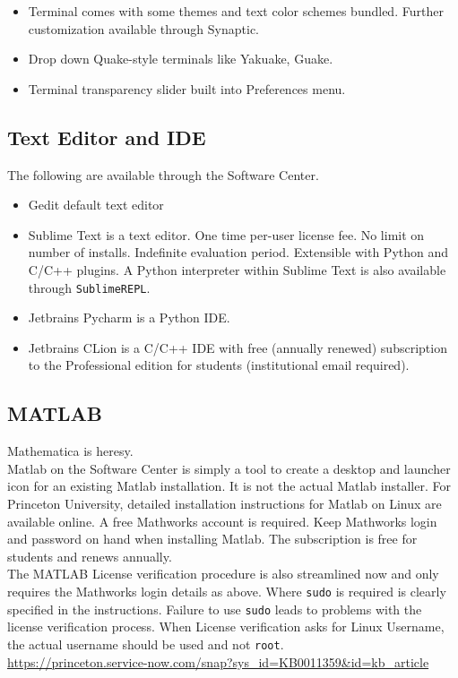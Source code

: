\documentclass[10pt,letterpaper]{article}
\begin{document}
\begin{itemize}
	\item Terminal comes with some themes and text color schemes bundled. Further customization available through Synaptic.
	\item Drop down Quake-style terminals like Yakuake, Guake.
	\item Terminal transparency slider built into Preferences menu.
\end{itemize}

\subsection{Text Editor and IDE}
The following are available through the Software Center.

\begin{itemize}
	\item Gedit default text editor
	\item Sublime Text is a text editor. One time per-user license fee. No limit on number of installs. Indefinite evaluation period. Extensible with Python and C/C++ plugins. A Python interpreter within Sublime Text is also available through \texttt{SublimeREPL}. 
	\item Jetbrains Pycharm is a Python IDE.
	\item Jetbrains CLion is a C/C++ IDE with free (annually renewed) subscription to the Professional edition for students (institutional email required).
\end{itemize}

\subsection{MATLAB}

Mathematica is heresy.\\

Matlab on the Software Center is simply a tool to create a desktop and launcher icon for an existing Matlab installation. It is not the actual Matlab installer.
For Princeton University, detailed installation instructions for Matlab on Linux are available online. A free Mathworks account is required. Keep Mathworks login and password on hand when installing Matlab. The subscription is free for students and renews annually.\\

The MATLAB License verification procedure is also streamlined now and only requires the Mathworks login details as above. Where \texttt{sudo} is required is clearly specified in the instructions. Failure to use \texttt{sudo} leads to problems with the license verification process. When License verification asks for Linux Username, the actual username should be used and not \texttt{root}.\\

\url{https://princeton.service-now.com/snap?sys_id=KB0011359&id=kb_article}\\
\end{document}
